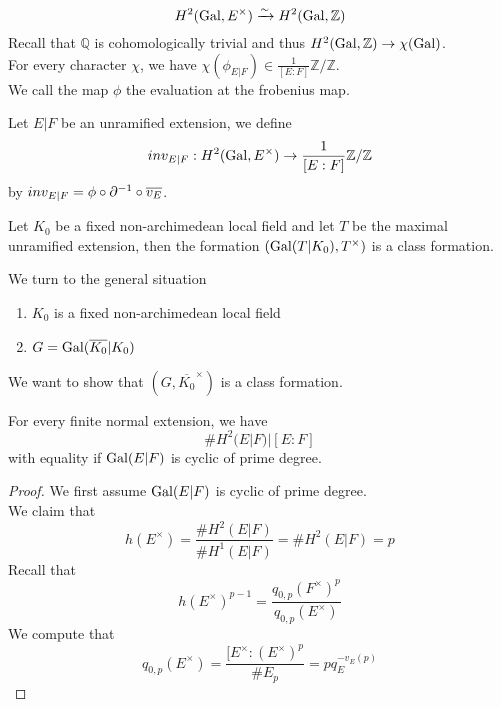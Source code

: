 \documentclass[../main.tex]{subfiles}
\begin{document}
\[ 
	H^{2}( \operatorname{Gal}, E^{\times}) \xrightarrow{\sim} H^{2}( \operatorname{Gal}, \mathbb{Z}) 
\]
Recall that $ \mathbb{Q}$ is cohomologically trivial and thus $H^{2}( \operatorname{Gal}, \mathbb{Z}) \to \chi( \operatorname{Gal}) $.\\
For every character $\chi$, we have $\chi( \phi_{E|F} ) \in \frac{1}{[E:F]}\mathbb{Z} /\mathbb{Z}$.\\
We call the map $\phi$ the evaluation at the frobenius map.
\begin{defn}
	Let $E|F$ be an unramified extension, we define
	\[ 
		inv_{E|F} :H^{2}( \operatorname{Gal}, E^{\times}) \to \frac{1}{[E:F]} \mathbb{Z} / \mathbb{Z}
	\]
	by $inv_{E|F} = \phi\circ\partial^{-1}\circ \overline{v_E}$.
	
\end{defn}
\begin{thm}
Let $K_0$ be a fixed non-archimedean local field and let $T$ be the maximal unramified extension, then the formation $( \operatorname{Gal}( T|K_0) , T^{\times}) $ is a class formation.
\end{thm}
We turn to the general situation
\begin{enumerate}
\item $K_0$ is a fixed non-archimedean local field
\item $G= \operatorname{Gal}( \overline{K_0} |K_0) $ 
\end{enumerate}
We want to show that $( G, \overline{K_0}^{\times}) $ is a class formation.
\begin{lemma}
For every finite normal extension, we have
\[ 
\# H^{2}( E|F) | [ E:F] 
\]
with equality if $\operatorname{Gal}( E|F) $ is cyclic of prime degree.	
\end{lemma}
\begin{proof}
We first assume $\operatorname{Gal}( E|F) $ is cyclic of prime degree.\\
We claim that
\[ 
h( E^{\times}) = \frac{\# H^{2}( E|F) }{\# H^{1}( E|F) }= \# H^{2}( E|F) = p
\]
Recall that
\[ 
h( E^{\times}) ^{p-1}= \frac{q_{0,p} ( F^{\times})^{p}}{q_{0,p} ( E^{\times}) }
\]
We compute that
\[ 
q_{0,p} ( E^{\times}) = \frac{[E^{\times}: ( E^{\times})^{p}}{\# E_p}= p q_E^{-v_E( p) }
\]

\end{proof}
\end{document}
